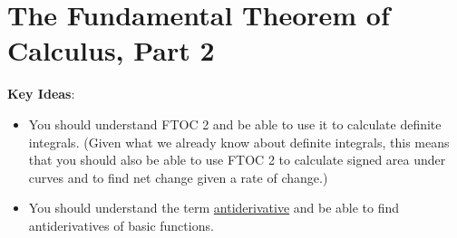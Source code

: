 \documentclass[main]{subfiles}
\begin{document}
\ifSubfilesClassLoaded{%
  \chaptermark{\chapterfive}
}{}

\section{The Fundamental Theorem of Calculus, Part 2} \label{ws5-6}

\begin{problemonly}
    \begin{framed}

\textbf{Key Ideas}:

\begin{itemize}[topsep=0pt,partopsep=0pt,parsep=8pt,itemsep=0pt]

\item You should understand FTOC 2 and be able to use it to calculate
  definite integrals.  (Given what we already know about definite
  integrals, this means that you should also be able to use FTOC 2 to
  calculate signed area under curves and to find net change given a rate
  of change.)

\item You should understand the term \uline{antiderivative} and be able to
  find antiderivatives of basic functions.

\end{itemize}
\end{framed}
\end{problemonly}
\end{document}
